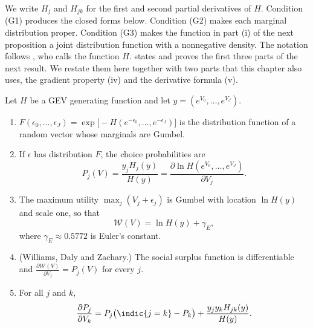 We write $H_j$ and $H_{jk}$ for the first and second partial derivatives of $H$. Condition (G1) produces the
closed forms below. Condition (G2) makes each marginal distribution proper. Condition (G3) makes the function in
part (i) of the next proposition a joint distribution function with a nonnegative density. The notation follows
\citet[p.~1421]{McFadden1984}, who calls the function $H$.  states and proves the first
three parts of the next result. We restate them here together with two parts that this chapter also uses, the
gradient property (iv) and the derivative formula (v).

\begin{proposition}\label{prop:07-gev}
Let $H$ be a GEV generating function and let $y = (e^{V_0}, \dots, e^{V_J})$.
\begin{enumerate}[label=(\roman*)]
  \item $F(\epsilon_0, \dots, \epsilon_J) = \exp\big[-H(e^{-\epsilon_0}, \dots, e^{-\epsilon_J})\big]$ is the
  distribution function of a random vector whose marginals are Gumbel.
  \item If $\epsilon$ has distribution $F$, the choice probabilities are
  \begin{equation}\label{eq:07-gev-prob}
  P_j(V) = \frac{y_j H_j(y)}{H(y)} = \frac{\partial \ln H(e^{V_0}, \dots, e^{V_J})}{\partial V_j}.
  \end{equation}
  \item The maximum utility $\max_j(V_j + \epsilon_j)$ is Gumbel with location $\ln H(y)$ and scale one, so that
  \begin{equation}\label{eq:07-gev-surplus}
  \mathcal{W}(V) = \ln H(y) + \gamma_E ,
  \end{equation}
  where $\gamma_E \approx 0.5772$ is Euler's constant.
  \item (Williams, Daly and Zachary.) The social surplus function is differentiable and
  $\frac{\partial \mathcal{W}(V)}{\partial V_j} = P_j(V)$ for every $j$.
  \item For all $j$ and $k$,
  \begin{equation}\label{eq:07-gev-deriv}
  \frac{\partial P_j}{\partial V_k} = P_j\big(\indic\{j = k\} - P_k\big) + \frac{y_j y_k H_{jk}(y)}{H(y)} .
  \end{equation}
\end{enumerate}
\end{proposition}

